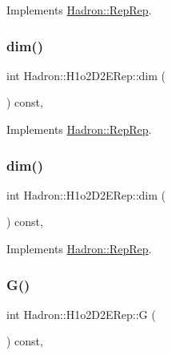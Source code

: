 Implements \mbox{\hyperlink{structHadron_1_1RepRep_a92c8802e5ed7afd7da43ccfd5b7cd92b}{Hadron\+::\+Rep\+Rep}}.

\mbox{\label{structHadron_1_1H1o2D2ERep_aeddb45f1ce47ceee776ea1714563280d}} 
\subsubsection{\texorpdfstring{dim()}{dim()}\hspace{0.1cm}{\footnotesize\ttfamily [2/3]}}
{\footnotesize\ttfamily int Hadron\+::\+H1o2\+D2\+E\+Rep\+::dim (\begin{DoxyParamCaption}{ }\end{DoxyParamCaption}) const\hspace{0.3cm}{\ttfamily [inline]}, {\ttfamily [virtual]}}



Implements \mbox{\hyperlink{structHadron_1_1RepRep_a92c8802e5ed7afd7da43ccfd5b7cd92b}{Hadron\+::\+Rep\+Rep}}.

\mbox{\label{structHadron_1_1H1o2D2ERep_aeddb45f1ce47ceee776ea1714563280d}} 
\subsubsection{\texorpdfstring{dim()}{dim()}\hspace{0.1cm}{\footnotesize\ttfamily [3/3]}}
{\footnotesize\ttfamily int Hadron\+::\+H1o2\+D2\+E\+Rep\+::dim (\begin{DoxyParamCaption}{ }\end{DoxyParamCaption}) const\hspace{0.3cm}{\ttfamily [inline]}, {\ttfamily [virtual]}}



Implements \mbox{\hyperlink{structHadron_1_1RepRep_a92c8802e5ed7afd7da43ccfd5b7cd92b}{Hadron\+::\+Rep\+Rep}}.

\mbox{\label{structHadron_1_1H1o2D2ERep_a09f0fcd2252874b4875f2931d43349b6}} 
\subsubsection{\texorpdfstring{G()}{G()}\hspace{0.1cm}{\footnotesize\ttfamily [1/2]}}
{\footnotesize\ttfamily int Hadron\+::\+H1o2\+D2\+E\+Rep\+::G (\begin{DoxyParamCaption}{ }\end{DoxyParamCaption}) const\hspace{0.3cm}{\ttfamily [inline]}, {\ttfamily [virtual]}}

